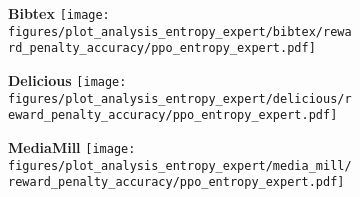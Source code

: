 \captionsetup{font=footnotesize}
\begin{figure}[H]
     \caption{Comparison of model performance for different values of entropy and expert accuracies for feedback: Reward Manipulation. The size and color of each bubble in the bubble plots represent the magnitude of the mean cumulative reward.}
    \label{fig:entr_thresh_expert_acc_reward_manipulation}
    \centering
    \begin{subfigure}[b]{0.32\columnwidth}
        \centering
        \setlength{\fboxsep}{1pt}\colorbox{lightgray!30}{\textbf{Bibtex}}
        \texttt{[image: figures/plot\_analysis\_entropy\_expert/bibtex/reward\_penalty\_accuracy/ppo\_entropy\_expert.pdf]}
    \end{subfigure}
    \hfill
    \begin{subfigure}[b]{0.32\columnwidth}
        \centering
        \setlength{\fboxsep}{1pt}\colorbox{lightgray!30}{\textbf{Delicious}}
        \texttt{[image: figures/plot\_analysis\_entropy\_expert/delicious/reward\_penalty\_accuracy/ppo\_entropy\_expert.pdf]}
    \end{subfigure}
    \hfill
    \begin{subfigure}[b]{0.32\columnwidth}
        \centering
        \setlength{\fboxsep}{1pt}\colorbox{lightgray!30}{\textbf{MediaMill}}
        \texttt{[image: figures/plot\_analysis\_entropy\_expert/media\_mill/reward\_penalty\_accuracy/ppo\_entropy\_expert.pdf]}
    \end{subfigure}
    \hfill
    

\end{figure}
